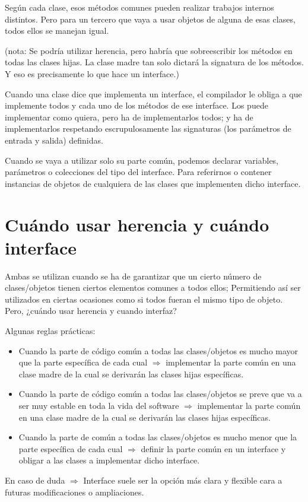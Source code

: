 \documentclass[spanish,12pt,a4paper,final,oneside]{book}
\begin{document}
Según cada clase, esos métodos comunes pueden realizar trabajos internos distintos. Pero para un tercero que vaya a usar objetos de alguna de esas clases, todos ellos se manejan igual.

(nota: Se podría utilizar herencia, pero habría que sobreescribir los métodos en todas las clases hijas. La clase madre tan solo dictará la signatura de los métodos. Y eso es precisamente lo que hace un interface.)

Cuando una clase dice que implementa un interface, el compilador le obliga a que implemente todos y cada uno de los métodos de ese interface. Los puede implementar como quiera, pero ha de implementarlos todos; y ha de implementarlos respetando escrupulosamente las signaturas (los parámetros de entrada y salida) definidas.

Cuando se vaya a utilizar solo su parte común, podemos declarar variables, parámetros o colecciones del tipo del interface. Para referirnos o contener instancias de objetos de cualquiera de las clases que implementen dicho interface.

\section{Cuándo usar herencia y cuándo interface}
Ambas se utilizan cuando se ha de garantizar que un cierto número de clases/objetos tienen ciertos elementos comunes a todos ellos; Permitiendo así ser utilizados en ciertas ocasiones como si todos fueran el mismo tipo de objeto. Pero, ¿cuándo usar herencia y cuando interfaz?

Algunas reglas prácticas:
\begin{itemize}
\item Cuando la parte de código común a todas las clases/objetos es mucho mayor que la parte específica de cada cual $\Rightarrow$ implementar la parte común en una clase madre de la cual se derivarán las clases hijas específicas.
\item Cuando la parte de código común a todas las clases/objetos se preve que va a ser muy estable en toda la vida del software $\Rightarrow$ implementar la parte común en una clase madre de la cual se derivarán las clases hijas específicas.
\item Cuando la parte de común a todas las clases/objetos es mucho menor que la parte específica de cada cual $\Rightarrow$ definir la parte común en un interface y obligar a las clases a implementar dicho interface.
\end{itemize}
En caso de duda $\Rightarrow$ Interface suele ser la opción más clara y flexible cara a futuras modificaciones o ampliaciones.
\end{document}
